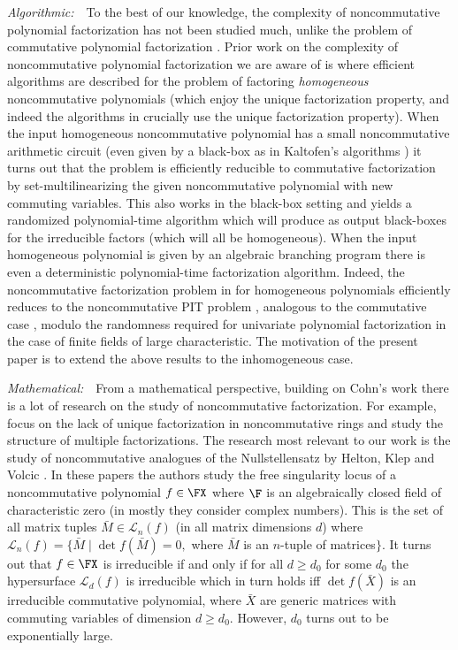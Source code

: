 \noindent\textit{Algorithmic:}~~To the best of our knowledge, the
complexity of noncommutative polynomial factorization has not been
studied much, unlike the problem of commutative polynomial
factorization \cite{vzg-book,K89,KT90}.  Prior work on the complexity
of noncommutative polynomial factorization we are aware of is
\cite{AJR18} where efficient algorithms are described for the problem
of factoring \emph{homogeneous} noncommutative polynomials (which
enjoy the unique factorization property, and indeed the algorithms in \cite{AJR18} crucially use the unique factorization property). When the input homogeneous
noncommutative polynomial has a small noncommutative arithmetic
circuit (even given by a black-box as in Kaltofen's algorithms
\cite{K89, KT90}) it turns out that the problem is efficiently
reducible to commutative factorization by set-multilinearizing the
given noncommutative polynomial with new commuting variables. This
also works in the black-box setting and yields a randomized
polynomial-time algorithm which will produce as output black-boxes for
the irreducible factors (which will all be homogeneous). When the
input homogeneous polynomial is given by an algebraic branching
program there is even a deterministic polynomial-time factorization
algorithm. Indeed, the noncommutative factorization problem in for
homogeneous polynomials efficiently reduces to the noncommutative PIT
problem \cite{AJR18}, analogous to the commutative case \cite{KSS14},
modulo the randomness required for univariate polynomial factorization
in the case of finite fields of large characteristic. The motivation
of the present paper is to extend the above results to the
inhomogeneous case.\smallskip

\noindent\textit{Mathematical:}~~From a mathematical perspective,
building on Cohn's work there is a lot of research on the study of
noncommutative factorization. For example, \cite{BS15,BHL17} focus on
the lack of unique factorization in noncommutative rings and study the
structure of multiple factorizations. The research most relevant to
our work is the study of noncommutative analogues of the
Nullstellensatz by Helton, Klep and Volcic \cite{HKV18,HKV20}. In  
these papers the authors study the free singularity locus of a
noncommutative polynomial $f\in\FX$ where $\F$ is an algebraically
closed field of characteristic zero (in \cite{HKV20} mostly they
consider complex numbers). This is the set of all matrix tuples
$\bar{M}\in\mathcal{L}_n(f)$ (in all matrix dimensions $d$) where
$\mathcal{L}_n(f)=\{\bar{M}\mid \det f(\bar{M}) = 0,$ where $\bar{M}$
is an $n$-tuple of matrices$\}$.  It turns out that $f\in\FX$ is
irreducible if and only if for all $d\ge d_0$ for some $d_0$ the
hypersurface $\mathcal{L}_d(f)$ is irreducible which in turn holds iff
$\det f(\bar{X})$ is an irreducible commutative polynomial, where
$\bar{X}$ are generic matrices with commuting variables of dimension
$d\ge d_0$. However, $d_0$ turns out to be exponentially large.



